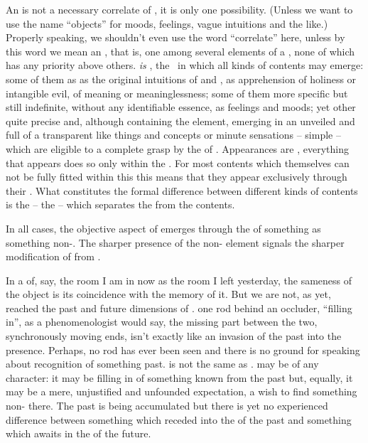 %
\label{pa:objects}\label{pa:distanceA}
An  is not a necessary correlate of , it is only one
possibility.  (Unless we want to use the name ``objects'' for moods, feelings,
vague intuitions and the like.)  Properly speaking, we shouldn't even use the
word ``correlate'' here, unless by this word we mean an , that
is, one among several elements of a \nexus, none of which has any priority above
others.   {\em is} , the \hoa\ in which all kinds of
contents may emerge: some of them as  as the original intuitions of
 and , as apprehension of holiness or intangible evil,
of meaning or meaninglessness; some of them more specific but still indefinite,
without any identifiable essence, as feelings and moods; yet other quite precise
and, although containing the  element, emerging in an unveiled
and full  of a transparent  like things and concepts or
minute sensations -- simple  -- which are eligible to a complete
grasp by the  of . Appearances are ,
everything that appears does so only within the \hoa. For most contents which
themselves can not be fully fitted within this  this means that they
appear exclusively through their  .  What constitutes the
formal difference between different kinds of contents is the  --
the  -- which separates the  from the
 contents.

\pa In all cases, the objective aspect of  emerges through the
 of something  as something non-.  The
sharper presence of the non- element signals the sharper modification
of  from .

In a  of, say, the room I am in now as the room I left
yesterday, the sameness of the  object is its coincidence
with the memory of it.  But we are not, as yet, reached the past and
future dimensions of .   one rod
behind an occluder, ``filling in'', as a phenomenologist would say,
the missing part between the two, synchronously moving ends,
isn't exactly like an invasion of the past into the presence. 
Perhaps, no rod has ever been seen and there is no ground for
speaking about recognition of something past.   is not
the same as .   may be of any
character: it may be filling in of something known from the past but,
equally, it may be a mere, unjustified and unfounded expectation, a
wish to find something non- there.  The past is being
accumulated but there is yet no experienced difference between
something which receded into the  of the past and
something which awaits in the  of the future.

